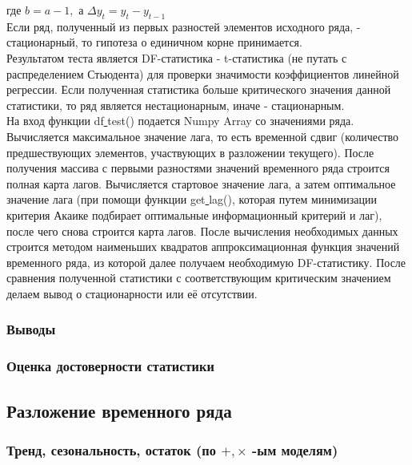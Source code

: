\documentclass{article}
\begin{document}
    где $b = a - 1,$ а $\Delta{y_t} = y_t - y_{t-1}$
    \\
    Если ряд, полученный из первых разностей элементов исходного ряда, - стационарный, то гипотеза о единичном корне принимается.
    \\
    Результатом теста является DF-статистика - t-статистика (не путать с распределением Стьюдента) для проверки значимости коэффициентов линейной регрессии. Если полученная статистика больше критического значения данной статистики, то ряд является нестационарным, иначе - стационарным.
    \\
    На вход функции df\underline{ }test() подается Numpy Array со значениями ряда. Вычисляется максимальное значение лага, то есть временной сдвиг (количество предшествующих элементов, участвующих в разложении текущего). После получения массива с первыми разностями значений временного ряда строится полная карта лагов. Вычисляется стартовое значение лага, а затем оптимальное значение лага (при помощи функции get\underline{ }lag(), которая путем минимизации критерия Акаике подбирает оптимальные информационный критерий и лаг), после чего снова строится карта лагов. После вычисления необходимых данных строится методом наименьших квадратов аппроксимационная функция значений временного ряда, из которой далее получаем необходимую DF-статистику. После сравнения полученной статистики с соответствующим критическим значением делаем вывод о стационарности или её отсутствии.
    
    \subsubsection{Выводы}
    
    \subsubsection{Оценка достоверности статистики}
  
  \newpage
    
  \subsection{Разложение временного ряда}
    
    \subsubsection{Тренд, сезональность, остаток (по $+, \times$ -ым моделям)} 
    
\end{document}
